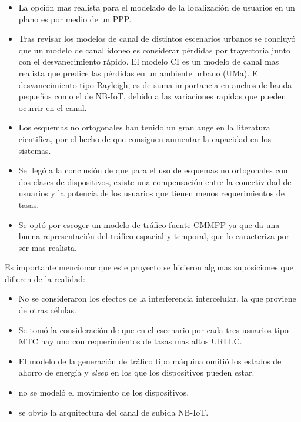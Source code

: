 \begin{itemize}
    \item La opción mas realista para el modelado de la localización de usuarios en un plano es por medio de un PPP.
  \item Tras revisar los modelos de canal de distintos escenarios urbanos se concluyó que un modelo de canal idoneo es considerar pérdidas por trayectoria junto con el desvanecimiento rápido.  El modelo CI es un modelo de canal mas realista que predice las pérdidas en un ambiente urbano (UMa). El desvanecimiento tipo Rayleigh, es de suma importancia en anchos de banda pequeños como el de NB-IoT, debido a las variaciones rapidas que pueden ocurrir en el canal.
    \item Los esquemas no ortogonales han tenido un gran auge en la literatura cientifica, por el hecho de que consiguen aumentar la capacidad en los sistemas.
    \item Se llegó a la conclusión de que para el uso de esquemas no ortogonales con dos clases de dispositivos, existe una compensación entre la conectividad de usuarios y la potencia de los usuarios que tienen menos requerimientos de tasas.
    \item Se optó por escoger un modelo de tráfico fuente CMMPP ya que da una buena representación del tráfico espacial y temporal, que lo caracteriza por ser mas realista.
\end{itemize}


Es importante mencionar que este proyecto se hicieron algunas suposiciones que  difieren de la realidad:
\begin{itemize}
    \item No se consideraron los efectos de la interferencia intercelular, la que proviene de otras células. 
    \item Se tomó la consideración de que en el escenario por cada tres usuarios tipo MTC hay uno con requerimientos de tasas mas altos URLLC.
    \item El modelo de la generación de tráfico tipo máquina omitió los estados de ahorro de energía y \textit{sleep} en los que los dispositivos pueden estar.
    \item no se modeló el movimiento de los dispositivos.
    \item se obvio la arquitectura del canal de subida NB-IoT.
\end{itemize}

